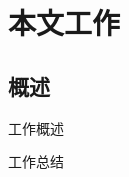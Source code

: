 \section{本文工作}

\subsection{概述}

\begin{frame}{工作概述}
\end{frame}



\begin{frame}{工作总结}
\end{frame}
